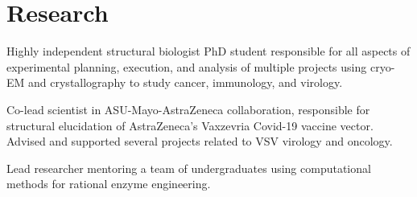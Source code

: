 \documentclass[]{deedy-resume-openfont}
\begin{document}
\begin{minipage}[t]{0.66\textwidth}


\section{Research}
Highly independent structural biologist PhD student responsible for all aspects of experimental planning, execution, and analysis of multiple projects using cryo-EM and crystallography to study cancer, immunology, and virology. 
\sectionsep

Co-lead scientist in ASU-Mayo-AstraZeneca collaboration, responsible for structural elucidation of AstraZeneca’s Vaxzevria Covid-19 vaccine vector. Advised and supported several projects related to VSV virology and oncology. 
\sectionsep

Lead researcher mentoring a team of undergraduates using computational methods for rational enzyme engineering. 



\end{minipage}
\end{document}
